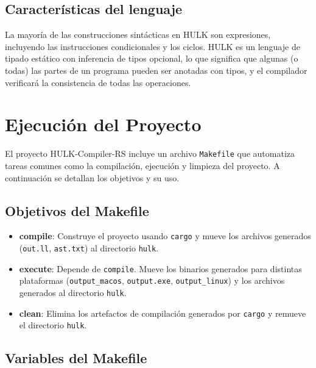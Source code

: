 \documentclass[a4paper, 12pt]{article}
\begin{document}
\subsection{Características del lenguaje}

La mayoría de las construcciones sintácticas en HULK son expresiones, incluyendo las instrucciones condicionales y los ciclos. HULK es un lenguaje de tipado estático con inferencia de tipos opcional, lo que significa que algunas (o todas) las partes de un programa pueden ser anotadas con tipos, y el compilador verificará la consistencia de todas las operaciones.

\section{Ejecución del Proyecto}

El proyecto HULK-Compiler-RS incluye un archivo \texttt{Makefile} que automatiza tareas comunes como la compilación, ejecución y limpieza del proyecto. A continuación se detallan los objetivos y su uso.

\subsection{Objetivos del Makefile}

\begin{itemize}
  \item \textbf{compile}: Construye el proyecto usando \texttt{cargo} y mueve los archivos generados (\texttt{out.ll}, \texttt{ast.txt}) al directorio \texttt{hulk}.
  \item \textbf{execute}: Depende de \texttt{compile}. Mueve los binarios generados para distintas plataformas (\texttt{output\_macos}, \texttt{output.exe}, \texttt{output\_linux}) y los archivos generados al directorio \texttt{hulk}.
  \item \textbf{clean}: Elimina los artefactos de compilación generados por \texttt{cargo} y remueve el directorio \texttt{hulk}.
\end{itemize}

\subsection{Variables del Makefile}
\end{document}
